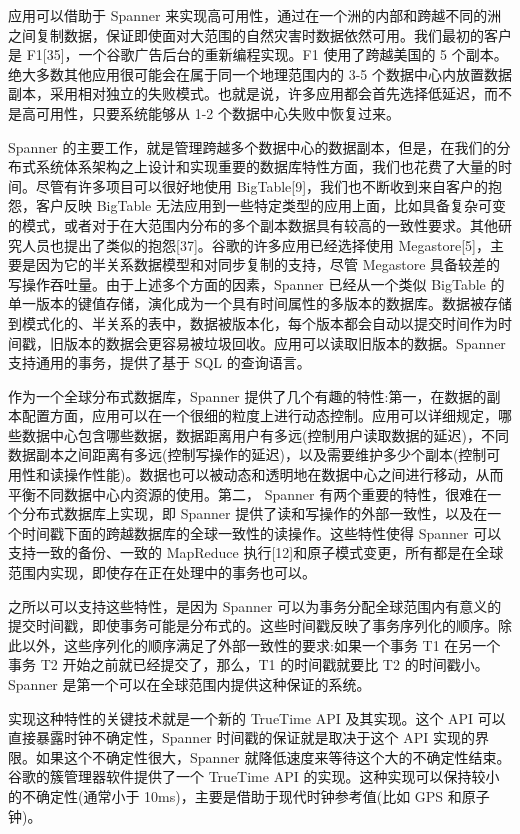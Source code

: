 \documentclass[letterpaper,twocolumn,10pt]{article}
\begin{document}
应用可以借助于 Spanner 来实现高可用性，通过在一个洲的内部和跨越不同的洲之间复制数据，保证即使面对大范围的自然灾害时数据依然可用。我们最初的客户是 F1[35]，一个谷歌广告后台的重新编程实现。F1 使用了跨越美国的 5 个副本。绝大多数其他应用很可能会在属于同一个地理范围内的 3-5 个数据中心内放置数据副本，采用相对独立的失败模式。也就是说，许多应用都会首先选择低延迟，而不是高可用性，只要系统能够从 1-2 个数据中心失败中恢复过来。

Spanner 的主要工作，就是管理跨越多个数据中心的数据副本，但是，在我们的分布式系统体系架构之上设计和实现重要的数据库特性方面，我们也花费了大量的时间。尽管有许多项目可以很好地使用 BigTable[9]，我们也不断收到来自客户的抱怨，客户反映 BigTable 无法应用到一些特定类型的应用上面，比如具备复杂可变的模式，或者对于在大范围内分布的多个副本数据具有较高的一致性要求。其他研究人员也提出了类似的抱怨[37]。谷歌的许多应用已经选择使用 Megastore[5]，主要是因为它的半关系数据模型和对同步复制的支持，尽管 Megastore 具备较差的写操作吞吐量。由于上述多个方面的因素，Spanner 已经从一个类似 BigTable 的单一版本的键值存储，演化成为一个具有时间属性的多版本的数据库。数据被存储到模式化的、半关系的表中，数据被版本化，每个版本都会自动以提交时间作为时间戳，旧版本的数据会更容易被垃圾回收。应用可以读取旧版本的数据。Spanner 支持通用的事务，提供了基于 SQL 的查询语言。

作为一个全球分布式数据库，Spanner 提供了几个有趣的特性:第一，在数据的副本配置方面，应用可以在一个很细的粒度上进行动态控制。应用可以详细规定，哪些数据中心包含哪些数据，数据距离用户有多远(控制用户读取数据的延迟)，不同数据副本之间距离有多远(控制写操作的延迟)，以及需要维护多少个副本(控制可用性和读操作性能)。数据也可以被动态和透明地在数据中心之间进行移动，从而平衡不同数据中心内资源的使用。第二， Spanner 有两个重要的特性，很难在一个分布式数据库上实现，即 Spanner 提供了读和写操作的外部一致性，以及在一个时间戳下面的跨越数据库的全球一致性的读操作。这些特性使得 Spanner 可以支持一致的备份、一致的 MapReduce 执行[12]和原子模式变更，所有都是在全球范围内实现，即使存在正在处理中的事务也可以。

之所以可以支持这些特性，是因为 Spanner 可以为事务分配全球范围内有意义的提交时间戳，即使事务可能是分布式的。这些时间戳反映了事务序列化的顺序。除此以外，这些序列化的顺序满足了外部一致性的要求:如果一个事务 T1 在另一个事务 T2 开始之前就已经提交了，那么，T1 的时间戳就要比 T2 的时间戳小。Spanner 是第一个可以在全球范围内提供这种保证的系统。

实现这种特性的关键技术就是一个新的 TrueTime API 及其实现。这个 API 可以直接暴露时钟不确定性，Spanner 时间戳的保证就是取决于这个 API 实现的界限。如果这个不确定性很大，Spanner 就降低速度来等待这个大的不确定性结束。谷歌的簇管理器软件提供了一个 TrueTime API 的实现。这种实现可以保持较小的不确定性(通常小于 10ms)，主要是借助于现代时钟参考值(比如 GPS 和原子钟)。
\end{document}
